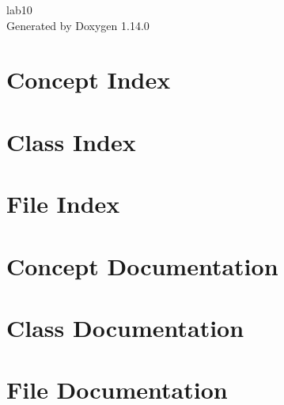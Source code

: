 \documentclass[twoside]{book}
\newcommand{\+}{\discretionary{\mbox{\scriptsize$\hookleftarrow$}}{}{}}
\newcommand{\clearemptydoublepage}{%
    \newpage{\pagestyle{empty}\cleardoublepage}%
  }
\begin{document}
  \raggedbottom
    \hypersetup{pageanchor=false,
                bookmarksnumbered=true,
                pdfencoding=unicode
               }
  \begin{titlepage}
  \vspace*{7cm}
  \begin{center}%
  {\Large lab10}\\
  \vspace*{1cm}
  {\large Generated by Doxygen 1.14.0}\\
  \end{center}
  \end{titlepage}
  \clearemptydoublepage
  \tableofcontents
  \clearemptydoublepage
  \hypersetup{pageanchor=true}
\chapter{Concept Index}

\chapter{Class Index}

\chapter{File Index}

\chapter{Concept Documentation}

\chapter{Class Documentation}







\chapter{File Documentation}









  \backmatter
  \newpage
  \clearemptydoublepage
  \printindex
\end{document}
